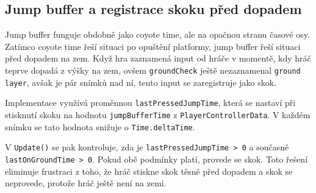 \subsection{Jump buffer a registrace skoku před dopadem}

Jump buffer funguje obdobně jako coyote time, ale na opačnou stranu časové osy. Zatímco coyote time řeší situaci po opuštění platformy, jump buffer řeší situaci před dopadem na zem. Když hra zaznamená input od hráče v momentě, kdy hráč teprve dopadá z výšky na zem, ovšem \texttt{groundCheck} ještě nezaznamenal \texttt{ground layer}, avšak je pár snímků nad ní, tento input se zaregistruje jako skok.

Implementace využívá proměnnou \texttt{lastPressedJumpTime}, která se nastaví při stisknutí skoku na hodnotu \texttt{jumpBufferTime} z \texttt{PlayerControllerData}. V každém snímku se tato hodnota snižuje o \texttt{Time.deltaTime}.

V \texttt{Update()} se pak kontroluje, zda je \texttt{lastPressedJumpTime > 0} a současně \texttt{lastOnGroundTime > 0}. Pokud obě podmínky platí, provede se skok. Toto řešení eliminuje frustraci z toho, že hráč stiskne skok těsně před dopadem a skok se neprovede, protože hráč ještě není na zemi.